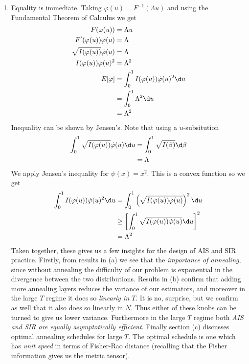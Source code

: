 \documentclass{article}
\begin{document}
\begin{enumerate}
    \item %
    Equality is immediate. Taking $\varphi(u) = F^{-1}(\Lambda u)$ and using the
    Fundamental Theorem of Calculus we get
    \begin{align}
        F(\varphi(u)) &= \Lambda u \\
        F'(\varphi(u))\dot\varphi(u) &= \Lambda \\
        \sqrt{I(\varphi(u))}\dot\varphi(u) &= \Lambda \\
        I(\varphi(u))\dot\varphi(u)^2 &= \Lambda^2 \\
        E[\varphi] &= \int_0^1 I(\varphi(u))\dot\varphi(u)^2 \d u \\
            &= \int_0^1 \Lambda^2 \d u  \\
            &= \Lambda^2
    \end{align}
    Inequality can be shown by Jensen's. Note that using a $u$-subsitution
    \begin{align}
        \int_0^1 \sqrt{I(\varphi(u))}\dot\varphi(u) \d u &= 
            \int_0^1 \sqrt{I(\beta)}\d \beta \\
            &= \Lambda
    \end{align}
    We apply Jensen's inequality for $\psi(x)=x^2$. This is a convex function
    so we get
    \begin{align}
        \int_0^1 I(\varphi(u))\dot\varphi(u)^2 \d u &= 
            \int_0^1 \left(\sqrt{I(\varphi(u))\dot\varphi(u)}\right)^2 \d u \\
            &\geq \left[ \int_0^1 \sqrt{I(\varphi(u))\dot\varphi(u)} \d u \right]^2 \\
            &= \Lambda^2
    \end{align}
    Taken together, these gives us a few insights for the design of AIS and SIR
    practice. Firstly, from results in (a) we see that the \emph{importance of
    annealing}, since without annealing the difficulty of our problem is
    exponential in the divergence between the two distributions. Results in 
    (b) confirm that adding more annealing layers reduces the variance of our
    estimators, and moreover in the large $T$ regime it does so 
    \emph{linearly in 
    $T$}. It is no, surprise, but we confirm as well that it also does so
    linearly in $N$. Thus either of these knobs can be turned to give us lower
    variance. Furthermore in the large $T$ regime both \emph{AIS and SIR are equally
    asymptotically efficient}. Finally section (c) discusses optimal annealing
    schedules for large $T$. The optimal schedule is one which has
    \emph{unit speed} in terms of Fisher-Rao distance (recalling that the Fisher
    information gives us the metric tensor).
\end{enumerate}
\end{document}
